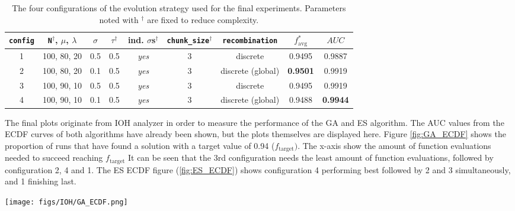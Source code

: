 \documentclass{article}
\begin{document}
\begin{table}[htbp]
    \centering
    \begin{tabular}{c|cccccc|cc}
        \toprule
        \texttt{config} &
        \texttt{N}$^\dagger$, $\mu$, $\lambda$ & $\sigma$ & $\tau^\dagger$ & ind. $\sigma$s$^\dagger$ & \texttt{chunk\_size}$^\dagger$ & \texttt{recombination}
            & $f^*_{\mathrm{avg}}$ & $AUC$ \\ %
        \midrule
        1 & 100, 80, 20  &  0.5  &  0.5  &  \textit{yes}  &  3  & discrete           &  0.9495           &  0.9887         \\
        2 & 100, 80, 20  &  0.1  &  0.5  &  \textit{yes}  &  3  & discrete (global)  &  \textbf{0.9501}  &  0.9919         \\
        3 & 100, 90, 10  &  0.5  &  0.5  &  \textit{yes}  &  3  & discrete           &  0.9495           &  0.9919         \\
        4 & 100, 90, 10  &  0.1  &  0.5  &  \textit{yes}  &  3  & discrete (global)  &  0.9488           & \textbf{0.9944} \\
        \bottomrule
    \end{tabular}
    \vspace{0.1cm}
    \captionsetup{width=.75\textwidth, justification=centering}
    \caption{
        The four configurations of the evolution strategy used for the final experiments.
        Parameters noted with $^\dagger$ are fixed to reduce complexity.
    }
    \label{tab:ES_final_configs}
\end{table}

The final plots originate from IOH analyzer in order to measure the performance of the GA and ES algorithm. 
The AUC values from the ECDF curves of both algorithms have already been shown, but the plots themselves are displayed here. 
Figure \ref{fig:GA_ECDF} shows the proportion of runs that have found a solution with a target value of 0.94 ($f_{\mathrm{target}})$. 
The x-axis show the amount of function evaluations needed to succeed reaching $f_{\mathrm{target}}$
It can be seen that the 3rd configuration needs the least amount of function evaluations, followed by configuration 2, 4 and 1. 
The ES ECDF figure (\ref{fig:ES_ECDF}) shows configuration 4 performing best followed by 2 and 3 simultaneously, and 1 finishing last.

\begin{figure*}[htbp]
    \centering
    \texttt{[image: figs/IOH/GA\_ECDF.png]}
    \captionsetup{width=.75\textwidth}
    \caption{ECDF curves for the four GA configurations measured earlier.}
    \label{fig:GA_ECDF}
\end{figure*}
\end{document}
